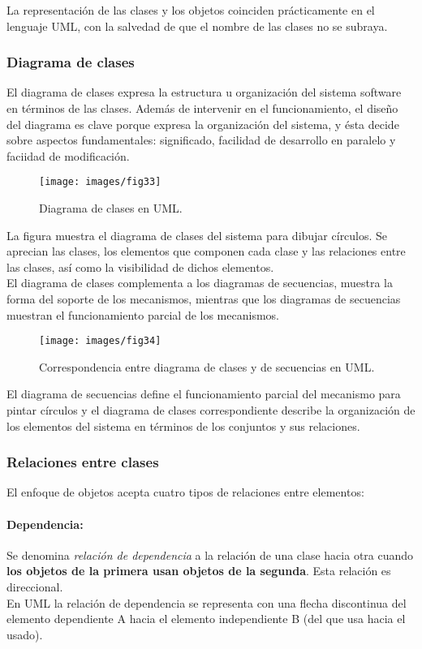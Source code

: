 La representación de las clases y los objetos coinciden prácticamente
en el lenguaje UML, con la salvedad de que el nombre de las clases no
se subraya.

\subsubsection{Diagrama de clases}
El diagrama de clases expresa la estructura u organización del sistema
software en términos de las clases. Además de intervenir en el
funcionamiento, el diseño del diagrama es clave porque expresa la
organización del sistema, y ésta decide sobre aspectos fundamentales:
significado, facilidad de desarrollo en paralelo y faciidad de modificación.

\begin{figure}[ht!]  \centering
  \texttt{[image: images/fig33]}
  \caption{Diagrama de clases en UML.}
  \label{fig:33}
\end{figure}

La figura muestra el diagrama de clases del sistema para dibujar
círculos. Se aprecian las clases, los elementos que componen cada
clase y las relaciones entre las clases, así como la visibilidad de
dichos elementos.\\
El diagrama de clases complementa a los diagramas de secuencias,
muestra la forma del soporte de los mecanismos, mientras que los
diagramas de secuencias muestran el funcionamiento parcial de los
mecanismos.
\begin{figure}[ht!]  \centering
  \texttt{[image: images/fig34]}
  \caption{Correspondencia entre diagrama de clases y de secuencias en UML.}
  \label{fig:34}
\end{figure}

El diagrama de secuencias define el funcionamiento parcial del
mecanismo para pintar círculos y el diagrama de clases correspondiente
describe la organización de los elementos del sistema en términos de
los conjuntos y sus relaciones.

\subsubsection{Relaciones entre clases}
El enfoque de objetos acepta cuatro tipos de relaciones entre elementos:
\paragraph{Dependencia:}
Se denomina \emph{relación de dependencia} a la relación de una clase
hacia otra cuando \textbf{los objetos de la primera usan objetos de la
  segunda}. Esta relación es direccional. \\
En UML la relación de dependencia se representa con una flecha
discontinua del elemento dependiente A hacia el elemento independiente
B (del que usa hacia el usado).
